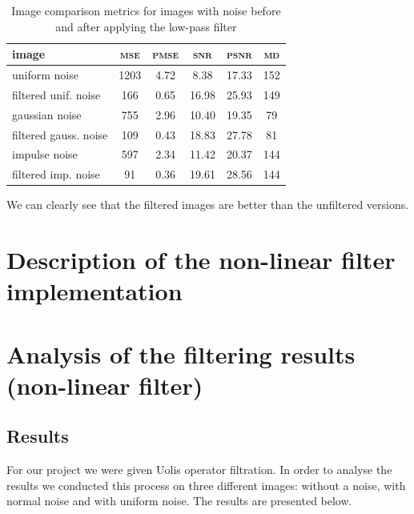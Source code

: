 \documentclass[12pt]{article}
\begin{document}
\begin{table}[H]\centering
    \begin{tabular}{l|ccccc}
        \toprule
        image                 & \textsc{mse} & \textsc{pmse} & \textsc{snr} & \textsc{psnr} & \textsc{md} \\
        \midrule[.5pt]
        uniform noise         & 1203         & 4.72          & 8.38         & 17.33         & 152         \\
        filtered unif. noise  & 166          & 0.65          & 16.98        & 25.93         & 149         \\
        \midrule[.1pt]
        gaussian noise        & 755          & 2.96          & 10.40        & 19.35         & 79          \\
        filtered gauss. noise & 109          & 0.43          & 18.83        & 27.78         & 81          \\
        \midrule[.1pt]
        impulse noise         & 597          & 2.34          & 11.42        & 20.37         & 144         \\
        filtered imp. noise   & 91           & 0.36          & 19.61        & 28.56         & 144         \\
        \bottomrule
    \end{tabular}
    \caption{Image comparison metrics for images with noise before and after applying the low-pass filter}
    \label{tab:lowpass-results-noise}
\end{table}

We can clearly see that the filtered images are better than the unfiltered versions.



\section{Description of the non-linear filter implementation }

\section{Analysis of the filtering results (non-linear filter)}
\subsection{Results}
For our project we were given Uolis operator filtration. In order to analyse the results we conducted this process on three different images: without a noise, with normal noise and with uniform noise. The results are presented below.
\end{document}
